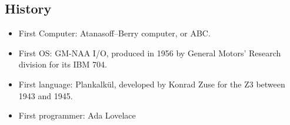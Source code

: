 \documentclass[12pt]{article}
\begin{document}
\subsection{History}
\begin{itemize}
    \item First Computer: Atanasoff–Berry computer, or ABC.
    \item First OS: GM-NAA I/O, produced in 1956 by General Motors' Research division for its IBM 704.
    \item First language: Plankalkül, developed by Konrad Zuse for the Z3 between 1943 and 1945.
    \item First programmer: Ada Lovelace
\end{itemize}
\end{document}

